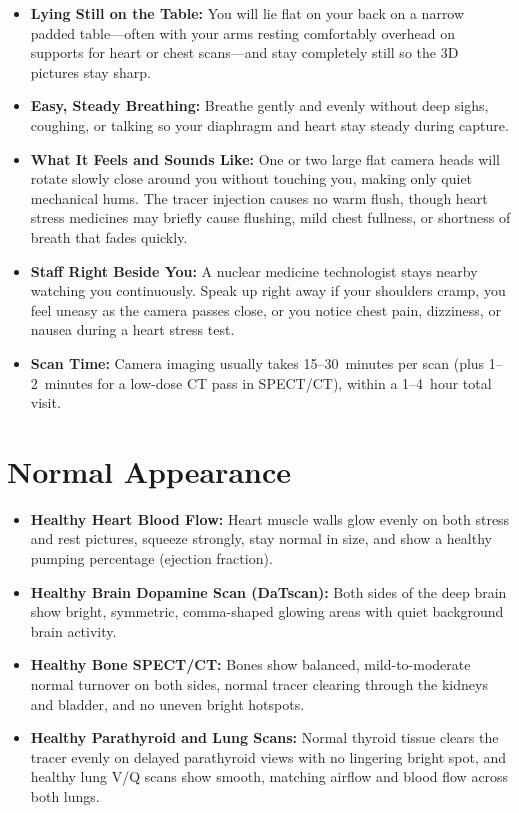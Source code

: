 \begin{itemize}
    \item \textbf{Lying Still on the Table:} You will lie flat on your back on a narrow padded table---often with your arms resting comfortably overhead on supports for heart or chest scans---and stay completely still so the 3D pictures stay sharp.
    \item \textbf{Easy, Steady Breathing:} Breathe gently and evenly without deep sighs, coughing, or talking so your diaphragm and heart stay steady during capture.
    \item \textbf{What It Feels and Sounds Like:} One or two large flat camera heads will rotate slowly close around you without touching you, making only quiet mechanical hums. The tracer injection causes no warm flush, though heart stress medicines may briefly cause flushing, mild chest fullness, or shortness of breath that fades quickly.
    \item \textbf{Staff Right Beside You:} A nuclear medicine technologist stays nearby watching you continuously. Speak up right away if your shoulders cramp, you feel uneasy as the camera passes close, or you notice chest pain, dizziness, or nausea during a heart stress test.
    \item \textbf{Scan Time:} Camera imaging usually takes 15--30~minutes per scan (plus 1--2~minutes for a low-dose CT pass in SPECT/CT), within a 1--4~hour total visit.
\end{itemize}

\section{Normal Appearance}

\begin{itemize}
    \item \textbf{Healthy Heart Blood Flow:} Heart muscle walls glow evenly on both stress and rest pictures, squeeze strongly, stay normal in size, and show a healthy pumping percentage (ejection fraction).
    \item \textbf{Healthy Brain Dopamine Scan (DaTscan):} Both sides of the deep brain show bright, symmetric, comma-shaped glowing areas with quiet background brain activity.
    \item \textbf{Healthy Bone SPECT/CT:} Bones show balanced, mild-to-moderate normal turnover on both sides, normal tracer clearing through the kidneys and bladder, and no uneven bright hotspots.
    \item \textbf{Healthy Parathyroid and Lung Scans:} Normal thyroid tissue clears the tracer evenly on delayed parathyroid views with no lingering bright spot, and healthy lung V/Q scans show smooth, matching airflow and blood flow across both lungs.
\end{itemize}

